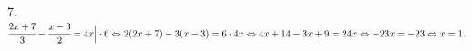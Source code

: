7. $\cfrac{2x+7}{3}-\cfrac{x-3}{2}=4x\Big|\cdot6\Leftrightarrow 2(2x+7)-3(x-3)=6\cdot4x\Leftrightarrow 4x+14-3x+9=24x\Leftrightarrow
-23x=-23\Leftrightarrow x=1.$\\
